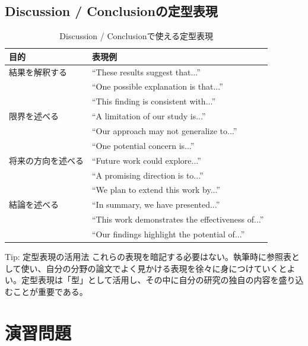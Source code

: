 \subsection{Discussion / Conclusionの定型表現}

\begin{table}[htbp]
\centering
\caption{Discussion / Conclusionで使える定型表現}
\label{tab:discussion-expressions}
\footnotesize
\begin{tabular}{lp{}}
\toprule
目的 & 表現例 \\
\midrule
結果を解釈する & ``These results suggest that...'' \\
 & ``One possible explanation is that...'' \\
 & ``This finding is consistent with...'' \\
\midrule
限界を述べる & ``A limitation of our study is...'' \\
 & ``Our approach may not generalize to...'' \\
 & ``One potential concern is...'' \\
\midrule
将来の方向を述べる & ``Future work could explore...'' \\
 & ``A promising direction is to...'' \\
 & ``We plan to extend this work by...'' \\
\midrule
結論を述べる & ``In summary, we have presented...'' \\
 & ``This work demonstrates the effectiveness of...'' \\
 & ``Our findings highlight the potential of...'' \\
\bottomrule
\end{tabular}
\end{table}

\begin{itembox}[l]{Tip: 定型表現の活用法}
これらの表現を暗記する必要はない。執筆時に参照表として使い、自分の分野の論文でよく見かける表現を徐々に身につけていくとよい。定型表現は「型」として活用し、その中に自分の研究の独自の内容を盛り込むことが重要である。
\end{itembox}

\section*{演習問題}

